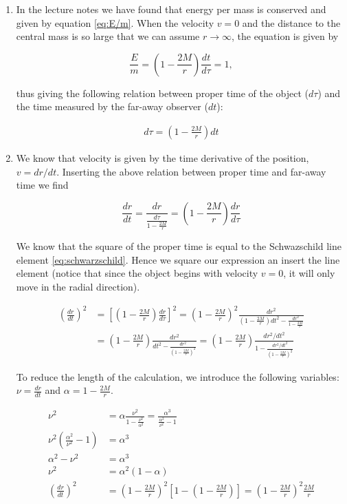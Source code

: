 \documentclass[a4paper,10pt,english]{article}
\begin{document}
\begin{enumerate}

\item In the lecture notes we have found that energy per mass is conserved and given by equation \ref{eq:E/m}. When the velocity $v=0$ and the distance to the central mass is so large that we can assume $r\to\infty$, the equation is given by

\[\frac{E}{m}=\left(1-\frac{2M}{r}\right)\frac{dt}{d\tau}=1,\]

thus giving the following relation between proper time of the object ($d\tau$) and the time measured by the far-away observer ($dt$):

\begin{align*}
d\tau=\left(1-\frac{2M}{r}\right)dt
\end{align*}

\item We know that velocity is given by the time derivative of the position, $v=dr/dt$. Inserting the above relation between proper time and far-away time we find

\[\frac{dr}{dt}=\frac{dr}{\frac{d\tau}{1-\frac{2M}{r}}}=\left(1-\frac{2M}{r}\right)\frac{dr}{d\tau}\]

We know that the square of the proper time is equal to the Schwazschild line element \ref{eq:schwarzschild}. Hence we square our expression an insert the line element (notice that since the object begins with velocity $v=0$, it will only move in the radial direction).

\begin{align*}
\left(\frac{dr}{dt}\right)^{2}&=\left[\left(1-\frac{2M}{r}\right)\frac{dr}{d\tau}\right]^{2}=\left(1-\frac{2M}{r}\right)^{2}\frac{dr^{2}}{\left(1-\frac{2M}{r}\right)dt^{2}-\frac{dr^{2}}{1-\frac{2M}{r}}}\\
&=\left(1-\frac{2M}{r}\right)\frac{dr^{2}}{dt^{2}-\frac{dr^{2}}{\left(1-\frac{2M}{r}\right)^{2}}}=\left(1-\frac{2M}{r}\right)\frac{dr^{2}/dt^{2}}{1-\frac{dr^{2}/dt^{2}}{\left(1-\frac{2M}{r}\right)^{2}}}
\end{align*}

To reduce the length of the calculation, we introduce the following variables: $\nu=\frac{dr}{dt}$ and $\alpha=1-\frac{2M}{r}$.

\begin{align*}
\nu^{2}&=\alpha\frac{\nu^{2}}{1-\frac{\nu^{2}}{\alpha^{2}}}=\frac{\alpha^{3}}{\frac{\alpha^{2}}{\nu^{2}}-1}\\
\nu^{2}\left(\frac{\alpha^{2}}{\nu^{2}}-1\right)&=\alpha^{3}\\
\alpha^{2}-\nu^{2}&=\alpha^{3}\\
\nu^{2}&=\alpha^{2}(1-\alpha)\\
\left(\frac{dr}{dt}\right)^{2}&=\left(1-\frac{2M}{r}\right)^{2}\left[1-\left(1-\frac{2M}{r}\right)\right]=\left(1-\frac{2M}{r}\right)^{2}\frac{2M}{r}
\end{align*}


\end{enumerate}
\end{document}
